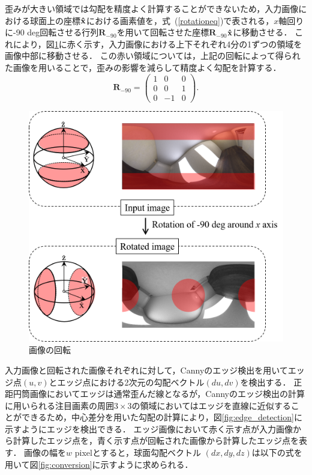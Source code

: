 \newpage

歪みが大きい領域では勾配を精度よく計算することができないため，入力画像における球面上の座標$\bf{\hat{x}}$における画素値を，式~(\ref{rotationeq})で表される，$x$軸回りに-90 deg回転させる行列$\bm{R}_{-90}$を用いて回転させた座標$\bm{R}_{-90}$$\bf{\hat{x}}$に移動させる．
これにより，図\ref{fig:calcgrad}に赤く示す，入力画像における上下それぞれ4分の1ずつの領域を画像中部に移動させる．
この赤い領域については，上記の回転によって得られた画像を用いることで，歪みの影響を減らして精度よく勾配を計算する．
\begin{equation}
  \bm{R}_{-90} = \left(
    \begin{array}{ccc}
      1 & 0 & 0 \\
      0 & 0 & 1 \\
      0 & -1 & 0
    \end{array}
  \right).
\label{rotationeq}
\end{equation}

\begin{figure}[b]
 \begin{center}
 \includegraphics[width=0.65\columnwidth]{./chap3/fig/calcgrad.png}
 \vspace{3mm}
 \caption{画像の回転}
 \label{fig:calcgrad}
 \end{center}
\end{figure}

入力画像と回転された画像それぞれに対して，Cannyのエッジ検出\mbox{\cite{Canny1986}}を用いてエッジ点$(u, v)$とエッジ点における2次元の勾配ベクトル$(du, dv)$を検出する．
正距円筒画像においてエッジは通常歪んだ線となるが，Cannyのエッジ検出の計算に用いられる注目画素の周囲$3\times3$の領域においてはエッジを直線に近似することができるため，中心差分を用いた勾配の計算により，図\ref{fig:edge_detection}に示すようにエッジを検出できる．
エッジ画像において赤く示す点が入力画像から計算したエッジ点を，青く示す点が回転された画像から計算したエッジ点を表す．
画像の幅を$w$ pixelとすると，球面勾配ベクトル $(dx, dy, dz)$は以下の式を用いて図\ref{fig:conversion}に示すように求められる．

